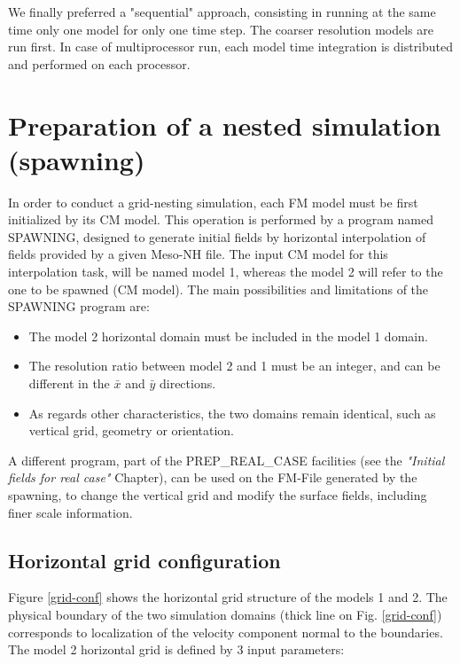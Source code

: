 We finally preferred a "sequential" approach, consisting in running at the same time
only one model for only one time step. The coarser resolution models are run first.
In case of multiprocessor run, each model time integration is distributed and
performed on each processor.


\section{Preparation of a nested simulation (spawning)}

 In order to conduct a grid-nesting simulation, each FM model must be first
initialized by its CM model.
This operation is performed by a program named SPAWNING,
designed to generate initial fields by horizontal interpolation
of fields provided by a given Meso-NH file.
The input CM model for this interpolation task, will be named model 1,
whereas the model 2 will refer to the one to be spawned (CM model).
The main possibilities and limitations of the SPAWNING program are:

\begin{itemize}
\item The model 2 horizontal domain must be included in the model 1 domain.
\item The resolution ratio between model 2 and 1 must be an integer, and
can be different in the $\bar x$ and $\bar y$ directions.
\item As regards other
characteristics, the two domains remain identical, such as vertical grid,
geometry or orientation.
\end{itemize}

 A different program, part of the PREP\_REAL\_CASE facilities
(see the {\it "Initial fields for real case"} Chapter), can be used
on the FM-File generated by the spawning, to change the vertical grid and
modify the surface fields, including finer scale information.

\subsection{Horizontal grid configuration}

 Figure \ref{grid-conf} shows the horizontal grid structure of the models 1 and
2. The physical boundary of the two simulation domains (thick line on
Fig. \ref{grid-conf}) corresponds to localization of the velocity component
normal to the boundaries.
 The  model 2 horizontal grid is defined by 3 input parameters:

